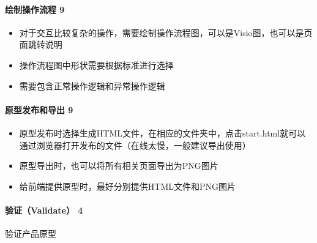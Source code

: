 \documentclass[letterpaper,10pt,english]{sphinxmanual}
\begin{document}
\paragraph{绘制操作流程 9\sphinxfootnotemark[617]}
\label{\detokenize{chapter_knowledge/prototype_design:id16}}%
\begin{footnotetext}[617]\sphinxAtStartFootnote
{}
%
\end{footnotetext}\ignorespaces \begin{itemize}
\item {} 
对于交互比较复杂的操作，需要绘制操作流程图，可以是Visio图，也可以是页面跳转说明

\item {} 
操作流程图中形状需要根据标准进行选择

\item {} 
需要包含正常操作逻辑和异常操作逻辑

\end{itemize}


\paragraph{原型发布和导出 9\sphinxfootnotemark[618]}
\label{\detokenize{chapter_knowledge/prototype_design:id17}}%
\begin{footnotetext}[618]\sphinxAtStartFootnote
{}
%
\end{footnotetext}\ignorespaces \begin{itemize}
\item {} 
原型发布时选择生成HTML文件，在相应的文件夹中，点击start.html就可以通过浏览器打开发布的文件（在线太慢，一般建议导出使用）

\item {} 
原型导出时，也可以将所有相关页面导出为PNG图片

\item {} 
给前端提供原型时，最好分别提供HTML文件和PNG图片

\end{itemize}


\paragraph{验证（Validate） 4\sphinxfootnotemark[619]}
\label{\detokenize{chapter_knowledge/prototype_design:validate-4}}%
\begin{footnotetext}[619]\sphinxAtStartFootnote
{}
%
\end{footnotetext}\ignorespaces 
验证产品原型
\end{document}

